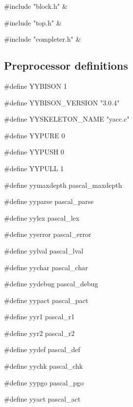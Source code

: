 \medskip
\begin{cxreftabi}
{\stt \#include "block.h"} &\\
\end{cxreftabi}

\medskip
\begin{cxreftabi}
{\stt \#include "top.h"} &\\
\end{cxreftabi}

\medskip
\begin{cxreftabi}
{\stt \#include "completer.h"} &\\
\end{cxreftabi}


\subsection*{Preprocessor definitions}

{\stt \#define YYBISON 1}

\medskip
{\stt \#define YYBISON\_VERSION "3.0.4"}

\medskip
{\stt \#define YYSKELETON\_NAME "yacc.c"}

\medskip
{\stt \#define YYPURE 0}

\medskip
{\stt \#define YYPUSH 0}

\medskip
{\stt \#define YYPULL 1}

\medskip
{\stt \#define yymaxdepth pascal\_maxdepth}

\medskip
{\stt \#define yyparse pascal\_parse}

\medskip
{\stt \#define yylex pascal\_lex}

\medskip
{\stt \#define yyerror pascal\_error}

\medskip
{\stt \#define yylval pascal\_lval}

\medskip
{\stt \#define yychar pascal\_char}

\medskip
{\stt \#define yydebug pascal\_debug}

\medskip
{\stt \#define yypact pascal\_pact}

\medskip
{\stt \#define yyr1 pascal\_r1}

\medskip
{\stt \#define yyr2 pascal\_r2}

\medskip
{\stt \#define yydef pascal\_def}

\medskip
{\stt \#define yychk pascal\_chk}

\medskip
{\stt \#define yypgo pascal\_pgo}

\medskip
{\stt \#define yyact pascal\_act}

